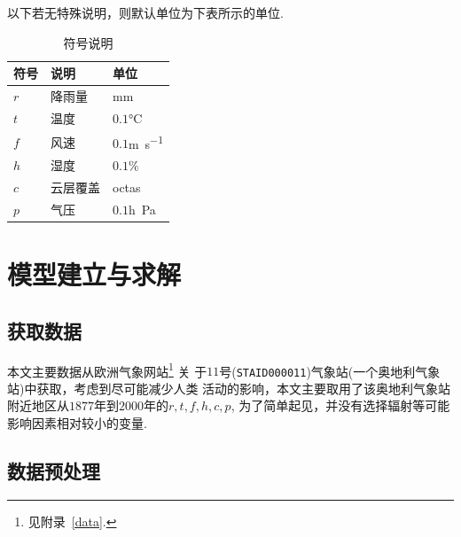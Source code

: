 \documentclass[UTF8, a4paper]{ctexart}
\begin{document}
以下若无特殊说明，则默认单位为下表所示的单位.

\begin{table}[h!]
	\centering
	\caption{符号说明}
	\begin{tabular}{p{6em}p{6em}l}
		\hline
		符号  & 说明   & 单位                          \\
		\hline
		$r$ & 降雨量  & \si{\milli\meter}           \\
		$t$ & 温度   & $0.1$\si{\degreeCelsius}    \\
		$f$ & 风速   & $0.1$\si{\meter\per\second} \\
		$h$ & 湿度   & $0.1\%$                     \\
		$c$ & 云层覆盖 & \si{octas}                  \\
		$p$ & 气压   & $0.1$\si{h\pascal}          \\
		\hline
	\end{tabular}
\end{table}

\section{模型建立与求解}

\subsection{获取数据}

本文主要数据从欧洲气象网站\footnote{见附录~\textcolor{red}{\ref{data}}.} 关
于$11$号(\verb+STAID000011+)气象站(一个奥地利气象站)中获取，考虑到尽可能减少人类
活动的影响，本文主要取用了该奥地利气象站附近地区从$1877$年到$2000$年的$r,t,f,h,c,p$,
为了简单起见，并没有选择辐射等可能影响因素相对较小的变量.


\subsection{数据预处理}
\end{document}
